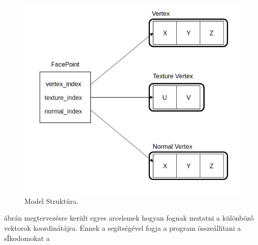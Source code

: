 \bigskip
\begin{figure}[h]
\centering
\includegraphics[scale=0.5]{images/point.png}
\caption{Model Struktúra.}
\label{fig:index_}
\end{figure}
\bigskip

 ábrán megtervezésre került egyes arcelemek hogyan fognak mutatni a különböző vektorok koordinátájra. Ennek a segítségével fogja a program összeállítani a sÍkodomokat a


